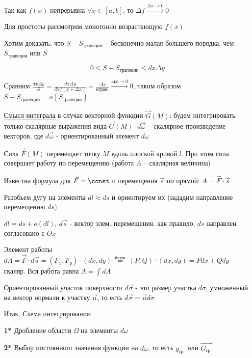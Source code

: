 \documentclass[12pt]{article}
\begin{document}
    Так как $f(x)$ непрерывна $\forall x \in [a, b]$, то $\Delta f \stackrel{\Delta x \to 0}{\rightarrow} 0$

    Для простоты рассмотрим монотонно возрастающую $f(x)$

    Хотим доказать, что $S - S_{\text{трапеции}}$ -- бесконечно малая большего порядка, чем $S_{\text{трапеции}}$ или $S$

    \[0 \leq S - S_{\text{трапеции}} \leq dx \Delta y\]

    Сравним $\frac{dx \Delta y}{S} = \frac{dx \Delta y}{dx f(x + \Delta x)} = \frac{\Delta y}{\text{огран.}} \stackrel{\Delta x \to 0}{\rightarrow} 0$, 
    таким образом $S - S_{\text{трапеции}} = o(S_{\text{трапеции}})$

    \underline{Смысл интеграла} в случае векторной функции $\overrightarrow{G}(M)$: будем интегрировать только скалярные выражения вида $\vec{G}(M) \cdot d\vec{\omega}$ -- скалярное произведение векторов,
    где $d\vec{\omega}$ - ориентированный элемент $d\omega$

    \Ex Сила $\vec{F}(M)$ перемещает точку $M$ вдоль плоской кривой $l$. При этом сила совершает работу по перемещению
    (работа $A$ -- скалярная величина)

    Известна формула для $\vec{F} = \const$ и перемещения $\vec{s}$ по прямой: $A = \vec{F} \cdot \vec{s}$

    Разобьем дугу на элементы $dl \approx ds$ и ориентируем их (зададим направление перемещению $ds$)

    $dl = ds + o(dl)$, $d\overrightarrow{s}$ - вектор элем. перемещения, как правило, $ds$ направлен согласовано с $Ox$

    Элемент работы $dA = \overrightarrow{F} \cdot d\overrightarrow{s} = (F_x, F_y) \cdot (dx, dy) \stackrel{\text{обозн.}}{=}
    (P, Q) \cdot (dx, dy) = Pdx + Qdy$ - скаляр. Вся работа равна $A = \int dA$

    \Nota Ориентированный участок поверхности $d\overrightarrow{\sigma}$ - это размер участка $d\sigma$, умноженный на вектор нормали к участку $\overrightarrow{n}$,
    то есть $d\overrightarrow{\sigma} = \overrightarrow{n}d\sigma$

    \underline{Итак.} Схема интегрирования:

    \textbf{1*} Дробление области $\Omega$ на элементы $d\omega$

    \textbf{2*} Выбор постоянного значения функции на $d\omega$, то есть $g_{\text{ср.}}$ или $\overrightarrow{G_\text{ср.}}$
\end{document}
